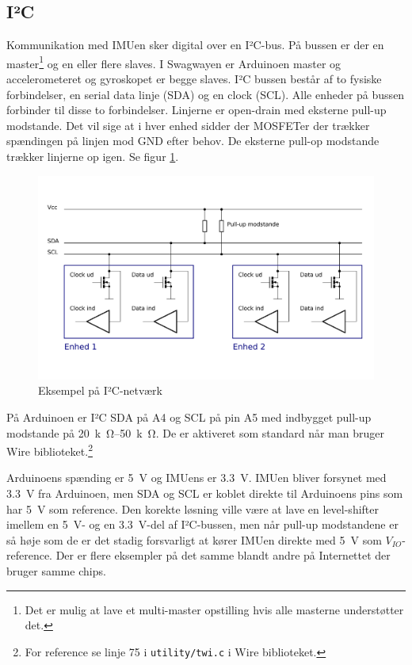 \documentclass[a4paper,11pt,oneside,article,danish,table]{memoir}
\begin{document}
\subsection{I²C}
Kommunikation med IMUen sker digital over en I²C-bus. På bussen er der en master\footnote{Det er mulig at lave et multi-master opstilling hvis alle masterne understøtter det.} og en eller flere slaves. I Swagwayen er Arduinoen master og accelerometeret og gyroskopet er begge slaves. I²C bussen består af to fysiske forbindelser, en serial data linje (SDA) og en clock (SCL). Alle enheder på bussen forbinder til disse to forbindelser. Linjerne er open-drain med eksterne pull-up modstande. Det vil sige at i hver enhed sidder der MOSFETer der trækker spændingen på linjen mod GND efter behov. De eksterne pull-op modstande trækker linjerne op igen. Se figur \ref{fig:i2cbasic}.
\begin{figure}[htbp]
  \centering
  \includegraphics[width=\textwidth]{pictures/I2Cbasic.pdf}
  \caption{Eksempel på I²C-netværk}
  \label{fig:i2cbasic}
\end{figure}

På Arduinoen er I²C SDA på A4 og SCL på pin A5 med indbygget pull-up modstande på \SI{20}{k\ohm}--\SI{50}{k\ohm}. \cite[s. 317]{atmega} De er aktiveret som standard når man bruger Wire biblioteket.\footnote{For reference se linje 75 i \texttt{utility/twi.c} i Wire biblioteket.}

Arduinoens spænding er \SI{5}{V} og IMUens er \SI{3,3}{V}. IMUen bliver forsynet med \SI{3,3}{V} fra Arduinoen, men SDA og SCL er koblet direkte til Arduinoens pins som har \SI{5}{V} som reference. Den korekte løsning ville være at lave en level-shifter imellem en \SI{5}{V}- og en \SI{3,3}{V}-del af I²C-bussen, men når pull-up modstandene er så høje som de er det stadig forsvarligt at kører IMUen direkte med \SI{5}{V} som $V_{IO}$-reference. Der er flere eksempler på det samme blandt andre på Internettet der bruger samme chips.
\end{document}
